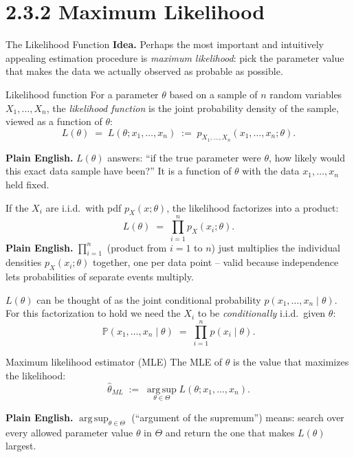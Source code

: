 \documentclass[aspectratio=169,10pt]{beamer}
\begin{document}
\section{2.3.2 Maximum Likelihood}

\begin{frame}[allowframebreaks]{The Likelihood Function}
  \textbf{Idea.} Perhaps the most important and intuitively appealing
  estimation procedure is \emph{maximum likelihood}: pick the parameter
  value that makes the data we actually observed as probable as possible.

  \begin{block}{Likelihood function}
    For a parameter $\theta$ based on a sample of $n$ random variables
    $X_1,\dots,X_n$, the \emph{likelihood function} is the joint probability
    density of the sample, viewed as a function of $\theta$:
    \[
      L(\theta) \;=\; L(\theta;x_1,\dots,x_n) \;:=\; p_{X_1,\dots,X_n}(x_1,\dots,x_n;\theta).
    \]
  \end{block}
  \textbf{Plain English.} $L(\theta)$ answers: ``if the true parameter were
  $\theta$, how likely would this exact data sample have been?'' It is a
  function of $\theta$ with the data $x_1,\dots,x_n$ held fixed.

  \framebreak

  If the $X_i$ are i.i.d.\ with pdf $p_X(x;\theta)$, the likelihood
  factorizes into a product:
  \[
    L(\theta) \;=\; \prod_{i=1}^{n} p_X(x_i;\theta).
  \]
  \textbf{Plain English.} $\prod_{i=1}^n$ (product from $i=1$ to $n$) just
  multiplies the individual densities $p_X(x_i;\theta)$ together, one per
  data point -- valid because independence lets probabilities of separate
  events multiply.

  $L(\theta)$ can be thought of as the joint conditional probability
  $p(x_1,\dots,x_n \mid \theta)$. For this factorization to hold we need the
  $X_i$ to be \emph{conditionally} i.i.d.\ given $\theta$:
  \[
    \mathbb{P}(x_1,\dots,x_n \mid \theta) \;=\; \prod_{i=1}^n p(x_i \mid \theta).
  \]

  \framebreak

  \begin{block}{Maximum likelihood estimator (MLE)}
    The MLE of $\theta$ is the value that maximizes the likelihood:
    \[
      \widehat{\theta}_{ML} \;:=\; \operatorname*{arg\,sup}_{\theta \in \Theta} L(\theta;x_1,\dots,x_n).
    \]
  \end{block}
  \textbf{Plain English.} $\operatorname*{arg\,sup}_{\theta \in \Theta}$
  (``argument of the supremum'') means: search over every allowed parameter
  value $\theta$ in $\Theta$ and return the one that makes $L(\theta)$
  largest.


\end{frame}
\end{document}
